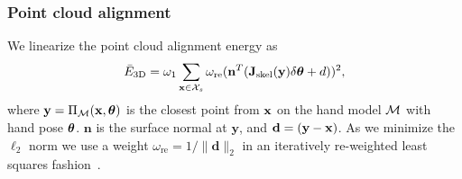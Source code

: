 \subsubsection*{Point cloud alignment} 
%
%
We linearize the point cloud alignment energy as 
%
\begin{equation*}
\bar{E}_{\text{3D}}  = \omega_1 \sum_{\mathbf{x} \in \mathcal{X}_{s}} \omega_{\text{re}} (\mathbf{n}^T(\mathbf{J}_{\text{skel}}(\mathbf{y}) \delta\boldsymbol{\theta} + d))^2,
\end{equation*}
%
where $\mathbf{y} = \Pi_{\mathcal{M}}(\mathbf{x},\boldsymbol{\theta})$ is the closest point from $\mathbf{x}$ on the hand model $\mathcal{M}$ with hand pose $\boldsymbol{\theta}$. $\mathbf{n}$ is the surface normal at $\mathbf{y}$, and $\mathbf{d} = (\mathbf{y} - \mathbf{x})$.
 As we minimize the $\ell_2$ norm we use a weight $\omega_{\text{re}}=1/\|\mathbf{d}\|_2$ in an iteratively re-weighted least squares fashion~\cite{bouaziz_sgp13}.
%
% 
%  
% 
%  
